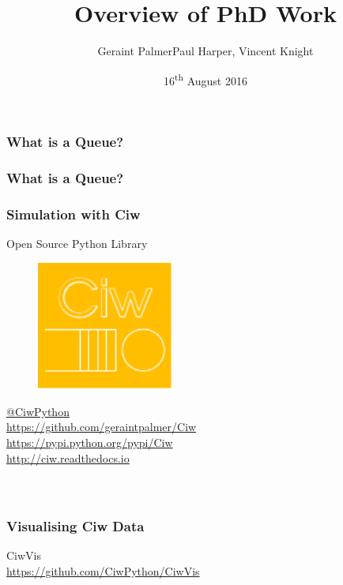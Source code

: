 \documentclass[xcolor={table}]{beamer}
\title{Overview of PhD Work}
\author{Geraint Palmer\newline \scriptsize{Paul Harper, Vincent Knight}}
\date{16\textsuperscript{th} August 2016}
\begin{document}
\frame{\titlepage}

\begin{frame}
\frametitle{What is a Queue?}
\begin{figure}
  
\end{figure}
\end{frame}

\begin{frame}
\frametitle{What is a Queue?}
\begin{figure}
  
\end{figure}
\end{frame}


\begin{frame}
\frametitle{Simulation with Ciw}
\begin{center}
Open Source Python Library\\
\begin{figure}
\includegraphics[width=0.4\textwidth]{logo}
\end{figure}
{\tiny
\href{https://twitter.com/CiwPython}{@CiwPython}\\
\url{https://github.com/geraintpalmer/Ciw}\\
\url{https://pypi.python.org/pypi/Ciw}\\
\url{http://ciw.readthedocs.io}\\}
\end{center}
\end{frame}

\begin{frame}
\begin{columns}

\fontsize{8pt}{10pt} \inputminted{python}{ciwexample_implement.py}
\end{columns}
\end{frame}

\begin{frame}
\frametitle{Visualising Ciw Data}
\begin{center}
\huge{CiwVis}\\
\tiny{\url{https://github.com/CiwPython/CiwVis}}\\

\end{center}
\end{frame}
\end{document}
